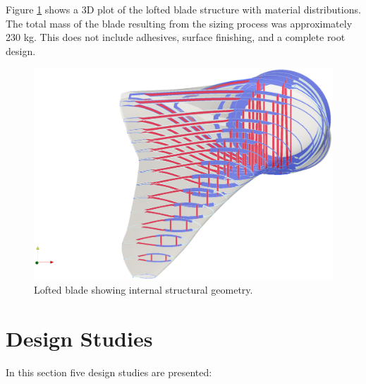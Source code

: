 Figure \ref{fig:loftedstructure_baseline} shows a 3D plot of the lofted blade structure with material distributions.
The total mass of the blade resulting from the sizing process was approximately 230 kg.
This does not include adhesives, surface finishing, and a complete root design.

\begin{figure}[!ht]
\begin{center}
	\includegraphics[width=1\linewidth]{figures/loftedbladestructure_basic_sizing.eps}
\end{center}
\caption{Lofted blade showing internal structural geometry.}
\label{fig:loftedstructure_baseline}
\end{figure}

\clearpage

\section{Design Studies}
\label{sec:design_studies}

In this section five design studies are presented:

